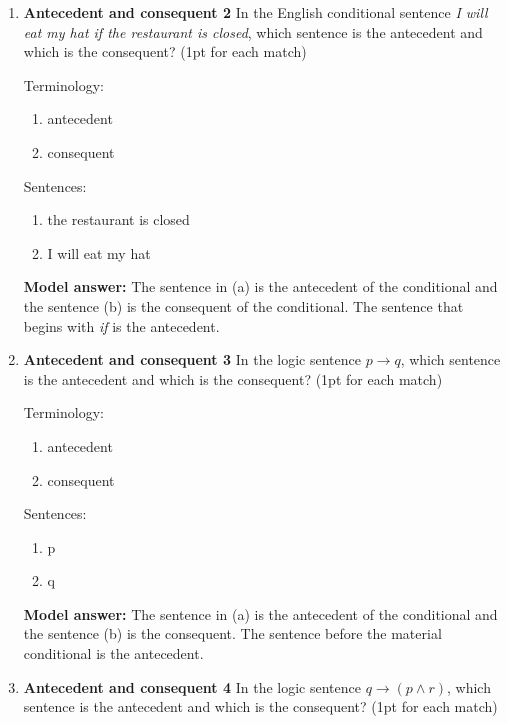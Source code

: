 \documentclass[a4,11pt]{article}
\newcommand{\6}{\mbox{$[\hspace*{-.6mm}[$}}
\newcommand{\9}{\mbox{$]\hspace*{-.6mm}]$}}
\begin{document}
\begin{enumerate}[leftmargin = 12pt]
{ \bf Model answer:}  The sentence in (a) is the antecedent of the conditional and the sentence (b) is the consequent of the conditional. The sentence that begins with {\em if} is the antecedent.

\item {\bf  Antecedent and consequent 2} In the English conditional sentence {\em I will eat my hat if the restaurant is closed}, which sentence is the antecedent and which is the consequent? (1pt for each match)

Terminology:

\begin{enumerate}
\item antecedent
\item consequent
\end{enumerate}

Sentences:


\begin{enumerate}
\item the restaurant is closed
\item I will eat my hat
\end{enumerate}

{ \bf Model answer:}  The sentence in (a) is the antecedent of the conditional and the sentence (b) is the consequent of the conditional. The sentence that begins with {\em if} is the antecedent.

\item {\bf  Antecedent and consequent 3} In the logic sentence $p \rightarrow q$, which sentence is the antecedent and which is the consequent? (1pt for each match)

Terminology:

\begin{enumerate}
\item antecedent
\item consequent
\end{enumerate}

Sentences:

\begin{enumerate}
\item p
\item q
\end{enumerate}

{ \bf Model answer:}  The sentence in (a) is the antecedent of the conditional and the sentence (b) is the consequent. The sentence before the material conditional  is the antecedent.

\item {\bf  Antecedent and consequent 4} In the logic sentence $ q \rightarrow (p \wedge r)$, which sentence is the antecedent and which is the consequent? (1pt for each match)


\end{enumerate}
\end{document}
